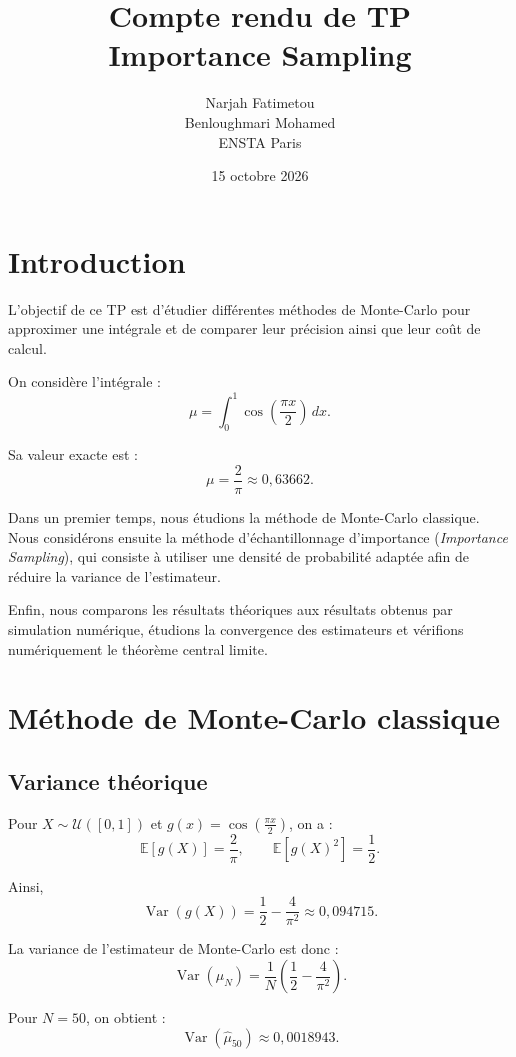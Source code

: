 \documentclass[12pt,a4paper]{article}
\title{
    \textbf{Compte rendu de TP}\\[0.3cm]
    \Large Importance Sampling
}
\author{
    Narjah Fatimetou\\
    Benloughmari Mohamed\\[0.3cm]
    ENSTA Paris
}
\date{15 octobre 2026}
\begin{document}
\maketitle

\section{Introduction}

L'objectif de ce TP est d'étudier différentes méthodes
de Monte-Carlo pour approximer une intégrale et de comparer
leur précision ainsi que leur coût de calcul.

On considère l'intégrale :
\[
\mu = \int_0^1 \cos\left(\frac{\pi x}{2}\right)\,dx.
\]

Sa valeur exacte est :
\[
\mu = \frac{2}{\pi} \approx 0{,}63662.
\]

Dans un premier temps, nous étudions la méthode de
Monte-Carlo classique. Nous considérons ensuite la méthode
d'échantillonnage d'importance (\textit{Importance Sampling}),
qui consiste à utiliser une densité de probabilité adaptée
afin de réduire la variance de l'estimateur.

Enfin, nous comparons les résultats théoriques aux résultats
obtenus par simulation numérique, étudions la convergence
des estimateurs et vérifions numériquement le théorème
central limite.

\section{Méthode de Monte-Carlo classique}

\subsection{Variance théorique}

Pour $X\sim\mathcal{U}([0,1])$ et
$g(x)=\cos\left(\frac{\pi x}{2}\right)$, on a :
\[
\mathbb{E}[g(X)]=\frac{2}{\pi},
\qquad
\mathbb{E}[g(X)^2]=\frac{1}{2}.
\]

Ainsi,
\[
\operatorname{Var}(g(X))
=\frac{1}{2}-\frac{4}{\pi^2}
\approx 0{,}094715.
\]

La variance de l'estimateur de Monte-Carlo est donc :
\[
\operatorname{Var}(\widehat{\mu}_N)
=\frac{1}{N}\left(\frac{1}{2}-\frac{4}{\pi^2}\right).
\]

Pour $N=50$, on obtient :
\[
\boxed{\operatorname{Var}(\widehat{\mu}_{50})
\approx 0{,}0018943.}
\]
\end{document}
